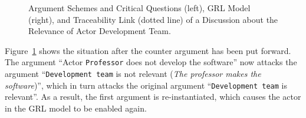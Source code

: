 \begin{figure}[ht!]
\centering
\caption{Argument Schemes and Critical Questions (left), GRL Model (right), and Traceability Link (dotted line) of a Discussion about the Relevance of Actor Development Team.}
\label{fig:examples:relevant-actor2}
\end{figure}

Figure~\ref{fig:examples:relevant-actor2} shows the situation after the counter argument has been put forward. The argument ``Actor \texttt{Professor} does not develop the software'' now attacks the argument ``\texttt{Development team} is not relevant (\emph{The professor makes the software})'', which in turn attacks the original argument ``\texttt{Development team} is relevant''. As a result, the first argument is re-instantiated, which causes the actor in the GRL model to be enabled again.

